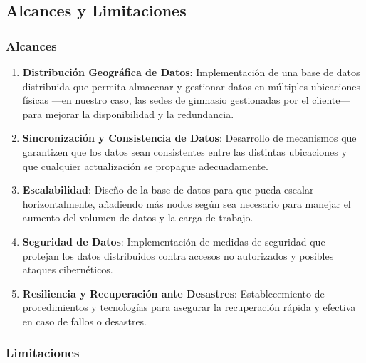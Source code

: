 \documentclass[spanish, 12pt]{article}
\providecommand{\tightlist}{\setlength{\itemsep}{0pt}
\setlength{\parskip}{0pt}}
\begin{document}
	\subsection{Alcances y Limitaciones}
	\label{alcances-y-limitaciones}

	\subsubsection{Alcances}
	\label{alcances}

	\begin{enumerate}
		\def\labelenumi{\arabic{enumi}.} \tightlist

		\item \textbf{Distribución Geográfica de Datos}: Implementación de una base de
			datos distribuida que permita almacenar y gestionar datos en múltiples ubicaciones
			físicas ---en nuestro caso, las sedes de gimnasio gestionadas por el cliente---
			para mejorar la disponibilidad y la redundancia.

		\item \textbf{Sincronización y Consistencia de Datos}: Desarrollo de mecanismos
			que garantizen que los datos sean consistentes entre las distintas ubicaciones
			y que cualquier actualización se propague adecuadamente.

		\item \textbf{Escalabilidad}: Diseño de la base de datos para que pueda escalar
			horizontalmente, añadiendo más nodos según sea necesario para manejar el
			aumento del volumen de datos y la carga de trabajo.

		\item \textbf{Seguridad de Datos}: Implementación de medidas de seguridad que
			protejan los datos distribuidos contra accesos no autorizados y posibles ataques
			cibernéticos.

		\item \textbf{Resiliencia y Recuperación ante Desastres}: Establecemiento de
			procedimientos y tecnologías para asegurar la recuperación rápida y efectiva
			en caso de fallos o desastres.
	\end{enumerate}

	\subsubsection{Limitaciones}
	\label{limitaciones}
\end{document}
